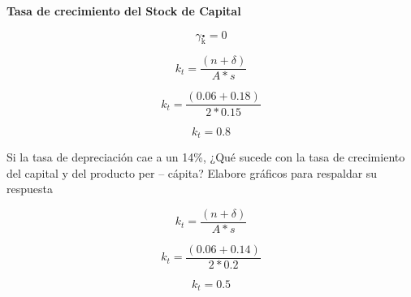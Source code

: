 \documentclass{oxmathproblems}
\begin{document}
\begin{questions}
\begin{parts}
\begin{subparts}
    \textbf{Tasa de crecimiento del Stock de Capital}
    
    
    
    $$\gamma _{\mathop k\limits^ \bullet}=0$$
    
    $$k_t=\dfrac{(n+\delta)}{A*s}$$
    
    $$k_t=\dfrac{(0.06+0.18)}{2*0.15}$$
    
    $$k_t= 0.8$$
    
    \subpart
    Si la tasa de depreciación cae a un 14\%, ¿Qué sucede con la tasa de crecimiento del capital y del producto per – cápita? Elabore gráficos para respaldar su respuesta
    
    $$k_t=\dfrac{(n+\delta)}{A*s}$$
    
     $$k_t=\dfrac{(0.06+0.14)}{2*0.2}$$
     
     $$k_t=0.5$$

  \end{subparts}
\end{parts}
            

\end{questions}
\end{document}
